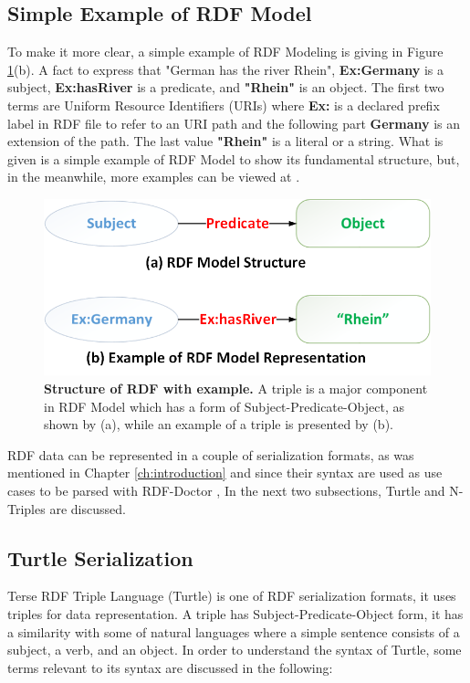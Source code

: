 \subsection{Simple Example of RDF Model}

To make it more clear, a simple example of RDF Modeling is giving in Figure \ref{Fig:rdfModel}(b). A fact to express that "German has the river Rhein", \textbf{Ex:Germany} is a subject, \textbf{Ex:hasRiver} is a predicate, and \textbf{"Rhein"} is an object. The first two terms are Uniform Resource Identifiers (URIs) where \textbf{Ex:} is a declared prefix label in RDF file to refer to an URI path and the following part \textbf{Germany} is an extension of the path. The last value \textbf{"Rhein"} is a literal or a string. What is given is a simple example of RDF Model to show its fundamental structure, but, in the meanwhile, more examples can be viewed at \cite{W3C:RDF-Primer:Online}.

\begin{figure}[ht]
	\begin{center}
		\includegraphics[scale=0.4,angle=0]{images/RDF-Model}
		\setlength\belowcaptionskip{-5mm}
		\caption{\textbf{ Structure of RDF with example.} A triple is a major component in RDF Model which has a form of Subject-Predicate-Object, as shown by (a), while an example of a triple is presented by (b).}
		\label{Fig:rdfModel}
	\end{center}
\end{figure}
RDF data can be represented in a couple of serialization formats, as was mentioned in Chapter \ref{ch:introduction} and since their syntax are used as use cases to be parsed with RDF-Doctor , In the next two subsections, Turtle and N-Triples are discussed. 


\subsection{Turtle Serialization}
 Terse RDF Triple Language (Turtle) \cite{W3C:Turtle:Online} is one of RDF serialization formats, it uses triples for data representation. A triple has Subject-Predicate-Object form, it  has a similarity with some of natural languages where a simple sentence consists of a subject, a verb, and an object. In order to understand the syntax of Turtle, some terms  relevant to its syntax are discussed in the following:

